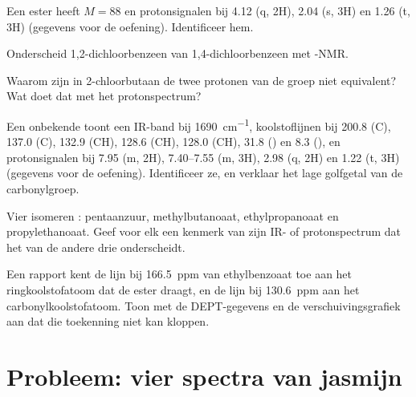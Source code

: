 \begin{exercise}[$\star\star$]\label{exo:b2:structure-determination:7}
Een ester heeft $M = 88$ en protonsignalen bij 4.12 (q, 2H), 2.04 (s, 3H) en 1.26 (t, 3H) (gegevens voor de
oefening). Identificeer hem.
\end{exercise}

\begin{exercise}[$\star\star$]\label{exo:b2:structure-determination:8}
Onderscheid 1,2-dichloorbenzeen van 1,4-dichloorbenzeen met -NMR.
\end{exercise}

\begin{exercise}[$\star\star$]\label{exo:b2:structure-determination:9}
Waarom zijn in 2-chloorbutaan de twee protonen van de groep  niet equivalent? Wat doet dat met
het protonspectrum?
\end{exercise}

\begin{exercise}[$\star\star\star$]\label{exo:b2:structure-determination:10}
Een onbekende  toont een IR-band bij \qty{1690}{cm^{-1}}, koolstoflijnen bij 200.8 (C), 137.0 (C),
132.9 (CH), 128.6 (CH), 128.0 (CH), 31.8 () en 8.3 (), en protonsignalen bij 7.95 (m,
2H), 7.40--7.55 (m, 3H), 2.98 (q, 2H) en 1.22 (t, 3H) (gegevens voor de oefening). Identificeer ze, en verklaar het
lage golfgetal van de carbonylgroep.
\end{exercise}

\begin{exercise}[$\star\star\star$]\label{exo:b2:structure-determination:11}
Vier isomeren : pentaanzuur, methylbutanoaat, ethylpropanoaat en propylethanoaat.
Geef voor elk een kenmerk van zijn IR- of protonspectrum dat het van de andere drie onderscheidt.
\end{exercise}

\begin{exercise}[$\star\star\star$]\label{exo:b2:structure-determination:12}
Een rapport kent de lijn bij 166.5~ppm van ethylbenzoaat toe aan het ringkoolstofatoom dat de ester draagt, en
de lijn bij 130.6~ppm aan het carbonylkoolstofatoom. Toon met de DEPT-gegevens en de verschuivingsgrafiek aan dat die
toekenning niet kan kloppen.
\end{exercise}

\section{Probleem: vier spectra van jasmijn}

